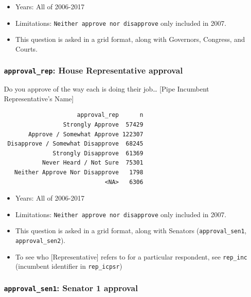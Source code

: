 \documentclass[10pt,article,oneside]{memoir}
\theoremstyle{definition}
\begin{document}
\begin{itemize}
\tightlist
\item
  Years: All of 2006-2017
\item
  Limitations: \texttt{Neither\ approve\ nor\ disapprove} only included
  in 2007.
\item
  This question is asked in a grid format, along with Governors,
  Congress, and Courts.
\end{itemize}

\hypertarget{approval_rep-house-representative-approval}{%
\subsubsection{\texorpdfstring{\texttt{approval\_rep}: House
Representative
approval}{approval\_rep: House Representative approval}}\label{approval_rep-house-representative-approval}}

Do you approve of the way each is doing their job\ldots{} {[}Pipe
Incumbent Representative's Name{]}

\begin{verbatim}
                     approval_rep      n
                 Strongly Approve  57429
       Approve / Somewhat Approve 122307
 Disapprove / Somewhat Disapprove  68245
              Strongly Disapprove  61369
           Never Heard / Not Sure  75301
   Neither Approve Nor Disapprove   1798
                             <NA>   6306
\end{verbatim}

\begin{itemize}
\tightlist
\item
  Years: All of 2006-2017
\item
  Limitations: \texttt{Neither\ approve\ nor\ disapprove} only included
  in 2007.
\item
  This question is asked in a grid format, along with Senators
  (\texttt{approval\_sen1}, \texttt{approval\_sen2}).
\item
  To see who {[}Representative{]} refers to for a particular respondent,
  see \texttt{rep\_inc} (incumbent identifier in \texttt{rep\_icpsr})
\end{itemize}

\hypertarget{approval_sen1-senator-1-approval}{%
\subsubsection{\texorpdfstring{\texttt{approval\_sen1}: Senator 1
approval}{approval\_sen1: Senator 1 approval}}\label{approval_sen1-senator-1-approval}}
\end{document}
